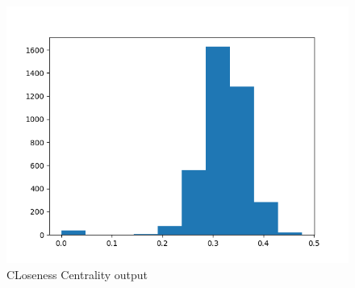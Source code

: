 \documentclass{article}
\begin{document}
\begin{figure}
    \centering
    \includegraphics[width=\textwidth,height=\textheight,keepaspectratio]{closeness_centrality.png}
    \caption{CLoseness Centrality output}
    \label{fig:part2closeness}
\end{figure}
\end{document}

